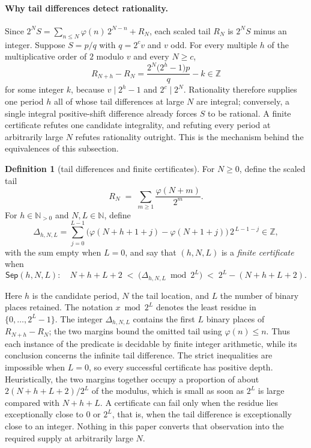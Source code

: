 \documentclass[11pt]{article}
\theoremstyle{definition}
\newtheorem{definition}[theorem]{Definition}
\theoremstyle{remark}
\newcommand{\N}{\mathbb{N}}
\newcommand{\Npos}{\mathbb{N}_{>0}}
\newcommand{\Z}{\mathbb{Z}}
\newcommand{\ph}{\varphi}
\begin{document}
\paragraph{Why tail differences detect rationality.}
Since \(2^NS=\sum_{n\le N}\ph(n)\,2^{N-n}+R_N\), each scaled tail
\(R_N\) is \(2^NS\) minus an integer.  Suppose \(S=p/q\) with
\(q=2^cv\) and \(v\) odd.  For every multiple \(h\) of the
multiplicative order of \(2\) modulo \(v\) and every \(N\geq c\),
\[
 R_{N+h}-R_N
 =\frac{2^N\bigl(2^h-1\bigr)p}{q}-k
 \in\Z
\]
for some integer \(k\), because \(v\mid2^h-1\) and \(2^c\mid2^N\).
Rationality therefore supplies one period \(h\) all of whose tail
differences at large \(N\) are integral; conversely, a single integral
positive-shift difference already forces \(S\) to be rational.  A finite
certificate refutes one candidate integrality, and refuting every period
at arbitrarily large \(N\) refutes rationality outright.  This is the
mechanism behind the equivalences of this subsection.

\begin{definition}[tail differences and finite certificates]
\label{def:totient-certificate}
For $N\ge0$, define the scaled tail
\[
R_N \;=\; \sum_{m\ge1}\frac{\ph(N+m)}{2^m}.
\]
For $h\in\Npos$ and $N,L\in\N$, define
\[
\Delta_{h,N,L}=\sum_{j=0}^{L-1}\big(\ph(N+h+1+j)-\ph(N+1+j)\big)\,2^{\,L-1-j}\in\Z,
\]
with the sum empty when \(L=0\),
and say that $(h,N,L)$ is a \emph{finite certificate} when
\[
\mathsf{Sep}(h,N,L):\quad
N+h+L+2 \;<\; \big(\Delta_{h,N,L}\bmod 2^L\big) \;<\; 2^L-(N+h+L+2).
\]
\end{definition}

Here $h$ is the candidate period, $N$ the tail location, and $L$ the number
of binary places retained.
The notation \(x\bmod 2^L\) denotes the least residue in
\(\{0,\ldots,2^L-1\}\).  The integer $\Delta_{h,N,L}$ contains the first
$L$ binary places of $R_{N+h}-R_N$; the two margins bound the omitted tail
using $\ph(n)\le n$.  Thus each instance of the predicate is decidable by
finite integer arithmetic, while its conclusion concerns the infinite tail
difference.  The strict inequalities are impossible when \(L=0\), so every
successful certificate has positive depth.
Heuristically, the two margins together occupy a proportion of about
\(2(N{+}h{+}L{+}2)/2^L\) of the modulus, which is small as soon as
\(2^L\) is large compared with \(N+h+L\).  A certificate can fail only
when the residue lies exceptionally close to \(0\) or \(2^L\), that is,
when the tail difference is exceptionally close to an integer.  Nothing
in this paper converts that observation into the required supply at
arbitrarily large \(N\).
\end{document}
